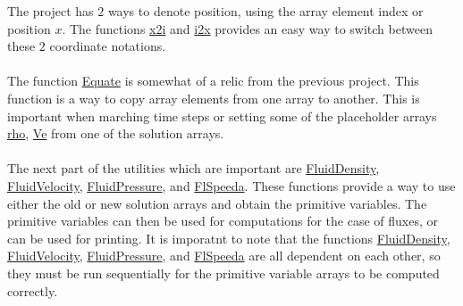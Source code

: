 The project has $2$ ways to denote position, using the array element index or position $x$. The functions \url{x2i} and \url{i2x} provides an easy way to switch between these $2$ coordinate notations.
\\~\\The function \url{Equate} is somewhat of a relic from the previous project. This function is a way to copy array elements from one array to another. This is important when marching time steps or setting some of the placeholder arrays \url{rho}, \url{Ve} from one of the solution arrays.
\\~\\The next part of the utilities which are important are \url{FluidDensity}, \url{FluidVelocity}, \url{FluidPressure}, and \url{FlSpeeda}. These functions provide a way to use either the old or new solution arrays and obtain the primitive variables. The primitive variables can then be used for computations for the case of fluxes, or can be used for printing. It is imporatnt to note that the functions \url{FluidDensity}, \url{FluidVelocity}, \url{FluidPressure}, and \url{FlSpeeda} are all dependent on each other, so they must be run sequentially for the primitive variable arrays to be computed correctly.
